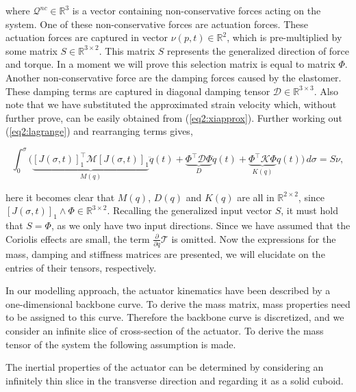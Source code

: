 where $\mathcal{Q}^{nc} \in \mathbb{R}^3$ is a vector containing non-conservative forces acting on the system. One of these non-conservative forces are actuation forces. These actuation forces are captured in vector $\nu(p,t) \in \mathbb{R}^2$, which is pre-multiplied by some matrix $S \in \mathbb{R}^{3\times 2}$. This matrix $S$ represents the generalized direction of force and torque. In a moment we will prove this selection matrix is equal to matrix $\Phi$. Another non-conservative force are the damping forces caused by the elastomer. These damping terms are captured in diagonal damping tensor $\mathcal{D} \in \mathbb{R}^{3 \times 3}$. Also note that we have substituted the approximated strain velocity which, without further prove, can be easily obtained from (\ref{eq2:xiapprox}). Further working out (\ref{eq2:lagrange}) and rearranging terms gives,

\begin{equation}
    \int_0^\sigma \Big( \underbrace{[J(\sigma,t)]_1^\top \mathcal{M} [J(\sigma,t)]_1}_{M(q)} \ddot{q}(t) +  \underbrace{\Phi^\top \mathcal{D} \Phi }_{D} \dot{q}(t)    +   \underbrace{\Phi^\top \mathcal{K} \Phi}_{K(q)} q(t)\Big) \hspace{2pt} d\sigma = S\nu,
\end{equation}

here it becomes clear that $M(q)$, $D(q)$ and $K(q)$ are all in $\mathbb{R}^{2\times2}$, since $[J(\sigma,t)]_1 \land \Phi \in \mathbb{R}^{3 \times 2}$. Recalling the generalized input vector $S$, it must hold that $S = \Phi$, as we only have two input directions. Since we have assumed that the Coriolis effects are small, the term $\frac{\partial}{\partial q}\mathcal{T} $ is omitted. Now the expressions for the mass, damping and stiffness matrices are presented, we will elucidate on the entries of their tensors, respectively.

In our modelling approach, the actuator kinematics have been described by a one-dimensional backbone curve. To derive the mass matrix, mass properties need to be assigned to this curve. Therefore the backbone curve is discretized, and we consider an infinite slice of cross-section of the actuator. To derive the mass tensor of the system the following assumption is made.

\begin{theorem}
The inertial properties of the actuator can be determined by considering an infinitely thin slice in the transverse direction and regarding it as a solid cuboid.
\end{theorem}

